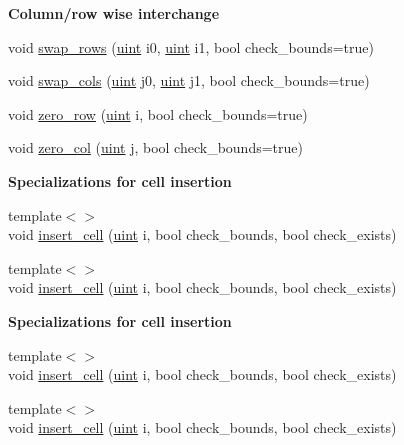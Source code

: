 \begin{Indent}\textbf{ Column/row wise interchange}\par
\begin{DoxyCompactItemize}
\item 
void \hyperlink{class_b_array_a742773803481c18e2865b2b2a1e68949}{swap\+\_\+rows} (\hyperlink{typedefs_8hpp_a91ad9478d81a7aaf2593e8d9c3d06a14}{uint} i0, \hyperlink{typedefs_8hpp_a91ad9478d81a7aaf2593e8d9c3d06a14}{uint} i1, bool check\+\_\+bounds=true)
\item 
void \hyperlink{class_b_array_ae94f7e61ca5985244968d9daf2859229}{swap\+\_\+cols} (\hyperlink{typedefs_8hpp_a91ad9478d81a7aaf2593e8d9c3d06a14}{uint} j0, \hyperlink{typedefs_8hpp_a91ad9478d81a7aaf2593e8d9c3d06a14}{uint} j1, bool check\+\_\+bounds=true)
\item 
void \hyperlink{class_b_array_a411085fcb7530669c72d9847340f1bac}{zero\+\_\+row} (\hyperlink{typedefs_8hpp_a91ad9478d81a7aaf2593e8d9c3d06a14}{uint} i, bool check\+\_\+bounds=true)
\item 
void \hyperlink{class_b_array_a0fa473027d00ec53ed08eaea03ac3ef7}{zero\+\_\+col} (\hyperlink{typedefs_8hpp_a91ad9478d81a7aaf2593e8d9c3d06a14}{uint} j, bool check\+\_\+bounds=true)
\end{DoxyCompactItemize}
\end{Indent}
\begin{Indent}\textbf{ Specializations for cell insertion}\par
\begin{DoxyCompactItemize}
\item 
{\footnotesize template$<$$>$ }\\void \hyperlink{class_b_array_a65aaf8f78714cd94616cf826b3eef6e1}{insert\+\_\+cell} (\hyperlink{typedefs_8hpp_a91ad9478d81a7aaf2593e8d9c3d06a14}{uint} i, bool check\+\_\+bounds, bool check\+\_\+exists)
\item 
{\footnotesize template$<$$>$ }\\void \hyperlink{class_b_array_a9a554db909a326d9110caa1d050f33e4}{insert\+\_\+cell} (\hyperlink{typedefs_8hpp_a91ad9478d81a7aaf2593e8d9c3d06a14}{uint} i, bool check\+\_\+bounds, bool check\+\_\+exists)
\end{DoxyCompactItemize}
\end{Indent}
\begin{Indent}\textbf{ Specializations for cell insertion}\par
\begin{DoxyCompactItemize}
\item 
{\footnotesize template$<$$>$ }\\void \hyperlink{class_b_array_a65aaf8f78714cd94616cf826b3eef6e1}{insert\+\_\+cell} (\hyperlink{typedefs_8hpp_a91ad9478d81a7aaf2593e8d9c3d06a14}{uint} i, bool check\+\_\+bounds, bool check\+\_\+exists)
\item 
{\footnotesize template$<$$>$ }\\void \hyperlink{class_b_array_a9a554db909a326d9110caa1d050f33e4}{insert\+\_\+cell} (\hyperlink{typedefs_8hpp_a91ad9478d81a7aaf2593e8d9c3d06a14}{uint} i, bool check\+\_\+bounds, bool check\+\_\+exists)
\end{DoxyCompactItemize}
\end{Indent}
